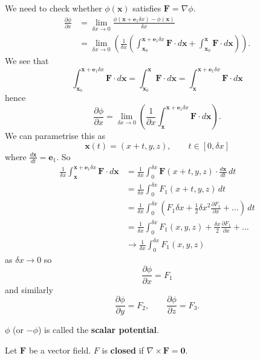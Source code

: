 
We need to check whether $\phi(\bm x)$ satisfies $\bm F = \nabla \phi$.
\begin{align*}
    \frac{\partial\phi}{\partial x}
    &= \lim_{\delta x \to 0} 
        \frac{\phi(\bm x + \bm e_1 \delta x) - \phi(\bm x)}{\delta x} \\
    &= \lim_{\delta x \to 0} 
        \left(
            \frac{1}{\delta x} 
            \left(
                \int_{\bm x_0}^{\bm x + \bm e_1 \delta x}
                \bm F \cdot d\bm x
                + \int_{\bm x_0}^{\bm x} 
                \bm F \cdot d\bm x
            \right)
        \right).
\end{align*}
We see that
\[
    \int_{\bm x_0}^{\bm x + \bm e_1 \delta x} \bm F \cdot d\bm x
    = \int_{\bm x_0}^{\bm x} \bm F \cdot d\bm x 
    = \int_{\bm x}^{\bm x + \bm e_1 \delta x} \bm F \cdot d\bm x
\]
hence
\[
    \frac{\partial \phi}{\partial x}
    = \lim_{\delta x \to 0}
    \left(
        \frac{1}{\partial x} 
        \int_{\bm x}^{\bm x + \bm e_1 \delta x}
        \bm F \cdot d\bm x
    \right).
\]
We can parametrise this as 
\[
    \bm x(t) = (x + t, y, z), \qquad t \in [0,\delta x]
\]
where
$\frac{d\bm x}{dt} = \bm e_1$.
So
\begin{align*}
    \frac{1}{\delta x}
        \int_{\bm x}^{\bm x + \bm e_1 \delta x} \bm F \cdot d\bm x
    &= \frac{1}{\delta x} \int_0^{\delta x} 
        \bm F(x + t, y, z) \cdot \frac{d\bm x}{dt} \,dt \\
    &= \frac{1}{\delta x} \int_0^{\delta x} 
        F_1(x + t, y, z) \,dt \\
    &= \frac{1}{\delta x} \int_0^{\delta x} 
        \left(
            F_1 \delta x 
            + \frac12 \delta x^2 \frac{\partial F_1}{\partial x} 
            + \ldots
        \right)
        \,dt \\
    &= \frac{1}{\delta x} \int_0^{\delta x}
        F_1(x,y,z) + \frac{\delta x}{2} \frac{\partial F_1}{\partial x} + \ldots \\
    &\to \frac{1}{\delta x} \int_0^{\delta x} F_1(x,y,z)
\end{align*}
as $\delta x \to 0$ so 
\[
    \frac{\partial\phi}{\partial x} = F_1
\]
and similarly
\[
    \frac{\partial\phi}{\partial y} = F_2, \qquad
    \frac{\partial\phi}{\partial z} = F_3.
\]

$\phi$ (or $-\phi$) is called the \textbf{scalar potential}.

\begin{definition}[Closed]
    Let $\bm F$ be a vector field.
    $F$ is \textbf{closed} if $\nabla \times \bm F = \bm 0$.
\end{definition}

